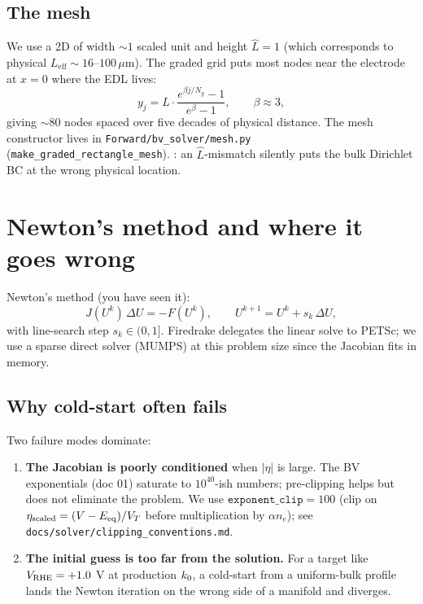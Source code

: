 \documentclass[11pt]{article}
\begin{document}
\subsection{The mesh}

We use a 2D  of width $\sim 1$ scaled
unit and height $\hat{L} = 1$ (which corresponds to physical
$L_{\mathrm{eff}} \sim 16$--$100\,\mu$m). The graded grid puts most
nodes near the electrode at $x = 0$ where the EDL lives:
\[
  y_j = \hat{L} \cdot \frac{e^{\beta j/N_y} - 1}{e^{\beta} - 1},
  \qquad \beta \approx 3,
\]
giving $\sim 80$ nodes spaced over five decades of physical
distance. The mesh constructor lives in
\texttt{Forward/bv\_solver/mesh.py} (\texttt{make\_graded\_rectangle\_mesh}).
: an $\hat{L}$-mismatch silently puts the bulk
Dirichlet BC at the wrong physical location.

\section{Newton's method and where it goes wrong}

Newton's method (you have seen it):
\[
  J(U^k)\,\Delta U = -F(U^k), \qquad U^{k+1} = U^k + s_k\,\Delta U,
\]
with line-search step $s_k \in (0,1]$. Firedrake delegates the
linear solve to PETSc; we use a sparse direct solver (MUMPS) at
this problem size since the Jacobian fits in memory.

\subsection{Why cold-start often fails}

Two failure modes dominate:

\begin{enumerate}[leftmargin=*]
\item \textbf{The Jacobian is poorly conditioned} when $|\eta|$ is
      large. The BV exponentials (doc 01) saturate
      to $10^{40}$-ish numbers; pre-clipping helps but does not
      eliminate the problem. We use $\texttt{exponent\_clip} = 100$
      (clip on $\eta_{\mathrm{scaled}} = (V - E_{\mathrm{eq}})/V_T$ before
      multiplication by $\alpha n_e$); see
      \texttt{docs/solver/clipping\_conventions.md}.
\item \textbf{The initial guess is too far from the solution.} For
      a target like $V_{\mathrm{RHE}} = +1.0$ V at production $k_0$, a
      cold-start from a uniform-bulk profile lands the Newton
      iteration on the wrong side of a manifold and diverges.
\end{enumerate}
\end{document}
